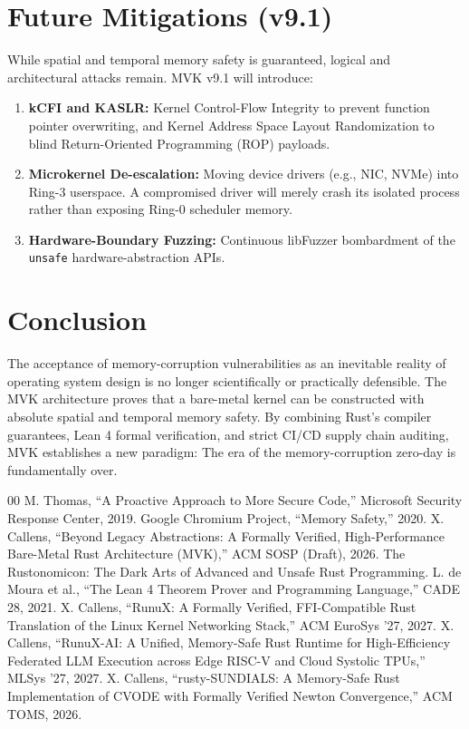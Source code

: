 \documentclass[conference]{IEEEtran}
\begin{document}
\section{Future Mitigations (v9.1)}
While spatial and temporal memory safety is guaranteed, logical and architectural attacks remain. MVK v9.1 will introduce:
\begin{enumerate}
    \item \textbf{kCFI and KASLR:} Kernel Control-Flow Integrity to prevent function pointer overwriting, and Kernel Address Space Layout Randomization to blind Return-Oriented Programming (ROP) payloads.
    \item \textbf{Microkernel De-escalation:} Moving device drivers (e.g., NIC, NVMe) into Ring-3 userspace. A compromised driver will merely crash its isolated process rather than exposing Ring-0 scheduler memory.
    \item \textbf{Hardware-Boundary Fuzzing:} Continuous libFuzzer bombardment of the \texttt{unsafe} hardware-abstraction APIs.
\end{enumerate}

\section{Conclusion}
The acceptance of memory-corruption vulnerabilities as an inevitable reality of operating system design is no longer scientifically or practically defensible. The MVK architecture proves that a bare-metal kernel can be constructed with absolute spatial and temporal memory safety. By combining Rust's compiler guarantees, Lean 4 formal verification, and strict CI/CD supply chain auditing, MVK establishes a new paradigm: The era of the memory-corruption zero-day is fundamentally over.

\begin{thebibliography}{00}
 M. Thomas, ``A Proactive Approach to More Secure Code,'' Microsoft Security Response Center, 2019.
 Google Chromium Project, ``Memory Safety,'' 2020.
 X. Callens, ``Beyond Legacy Abstractions: A Formally Verified, High-Performance Bare-Metal Rust Architecture (MVK),'' ACM SOSP (Draft), 2026.
 The Rustonomicon: The Dark Arts of Advanced and Unsafe Rust Programming.
 L. de Moura et al., ``The Lean 4 Theorem Prover and Programming Language,'' CADE 28, 2021.
 X. Callens, ``RunuX: A Formally Verified, FFI-Compatible Rust Translation of the Linux Kernel Networking Stack,'' ACM EuroSys '27, 2027.
 X. Callens, ``RunuX-AI: A Unified, Memory-Safe Rust Runtime for High-Efficiency Federated LLM Execution across Edge RISC-V and Cloud Systolic TPUs,'' MLSys '27, 2027.
 X. Callens, ``rusty-SUNDIALS: A Memory-Safe Rust Implementation of CVODE with Formally Verified Newton Convergence,'' ACM TOMS, 2026.
\end{thebibliography}
\end{document}
